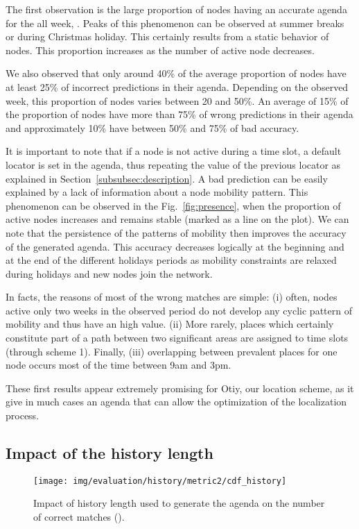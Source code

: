 \documentclass[a4paper]{sig-alternate-10pt}
\newcommand{\otiy}{{\sffamily Otiy}}
\begin{document}
The first observation is the large proportion of nodes having an
accurate agenda for the all week, . Peaks of this
phenomenon can be observed at summer breaks or during Christmas
holiday. This certainly results from a static behavior of nodes.
This proportion increases as the number of active node decreases.

We also observed that only around 40\% of the average proportion 
of nodes have at least 25\% of incorrect predictions in their agenda.
Depending on the observed week, this  proportion of nodes varies
between 20 and 50\%. An average of 15\% of the proportion of nodes 
have more than 75\% of wrong predictions in their agenda and 
approximately 10\% have between 50\% and 75\% of bad accuracy.

It is important to note that if a node is not active during a time
slot, a default locator is set in the agenda, thus repeating the
value of the previous locator as explained in
Section~\ref{subsubsec:description}. A bad prediction can be easily
explained by a lack of information about a node mobility pattern.
This phenomenon can be observed in the Fig.~\ref{fig:presence}, when
the proportion of active nodes increases and remains stable
(marked as a line on the plot). We can note that the persistence of
the patterns of mobility then improves the accuracy of the
generated agenda. This accuracy decreases logically at the beginning
and at the end of the different holidays periods as mobility
constraints are relaxed during holidays and new nodes join the
network.

In facts, the reasons of most of the wrong matches are simple: (i)
often, nodes active only two weeks in the observed period do not
develop any cyclic pattern of mobility and thus have an high
 value. (ii) More rarely, places which certainly constitute 
part of a path between two significant areas are assigned to time slots
(through scheme 1). Finally, (iii) overlapping between prevalent
places for one node occurs most of the time between 9am and 3pm.

These first results appear extremely promising for \otiy, our
location scheme, as it give in much cases an agenda that can allow
the optimization of  the localization process.

\subsection{Impact of the history length}
\begin{figure}
\texttt{[image: img/evaluation/history/metric2/cdf\_history]}
\caption{Impact of history length used to generate the agenda on the
number of correct matches ().}
\label{fig:history_length}
\end{figure}
\end{document}
